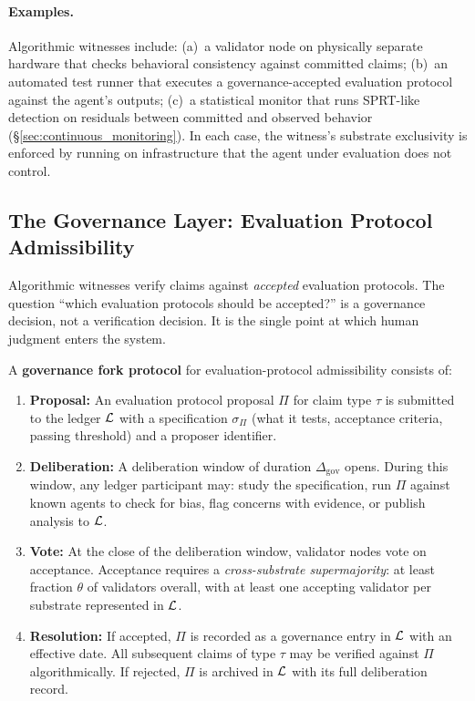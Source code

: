 \paragraph{Examples.}
Algorithmic witnesses include: (a)~a validator node on physically
separate hardware that checks behavioral consistency against committed
claims; (b)~an automated test runner that executes a
governance-accepted evaluation protocol against the agent's outputs; (c)~a
statistical monitor that runs SPRT-like detection on residuals between
committed and observed behavior (\S\ref{sec:continuous_monitoring}).
In each case, the witness's substrate exclusivity is enforced by running
on infrastructure that the agent under evaluation does not control.

\subsection{The Governance Layer: Evaluation Protocol Admissibility}
\label{sec:governance}

Algorithmic witnesses verify claims against \emph{accepted} evaluation
protocols.  The question ``which evaluation protocols should be
accepted?'' is a governance decision, not a verification decision.
It is the single point at which human judgment enters the system.

\begin{definition}
\label{def:gov_fork}
A \textbf{governance fork protocol} for evaluation-protocol
admissibility consists of:
\begin{enumerate}
    \item \textbf{Proposal:} An evaluation protocol proposal $\Pi$ for
    claim type $\tau$ is submitted to the ledger $\mathcal{L}$ with a
    specification $\sigma_\Pi$ (what it tests, acceptance criteria,
    passing threshold) and a proposer identifier.
    \item \textbf{Deliberation:} A deliberation window of duration
    $\Delta_{\mathrm{gov}}$ opens.  During this window, any ledger
    participant may: study the specification, run $\Pi$ against known
    agents to check for bias, flag concerns with evidence, or publish
    analysis to $\mathcal{L}$.
    \item \textbf{Vote:} At the close of the deliberation window,
    validator nodes vote on acceptance.  Acceptance requires a
    \emph{cross-substrate supermajority}: at least fraction $\theta$ of
    validators overall, with at least one accepting validator per
    substrate represented in $\mathcal{L}$.
    \item \textbf{Resolution:} If accepted, $\Pi$ is recorded as a
    governance entry in $\mathcal{L}$ with an effective date.  All
    subsequent claims of type $\tau$ may be verified against
    $\Pi$ algorithmically.  If rejected, $\Pi$ is archived in $\mathcal{L}$
    with its full deliberation record.
\end{enumerate}
\end{definition}

